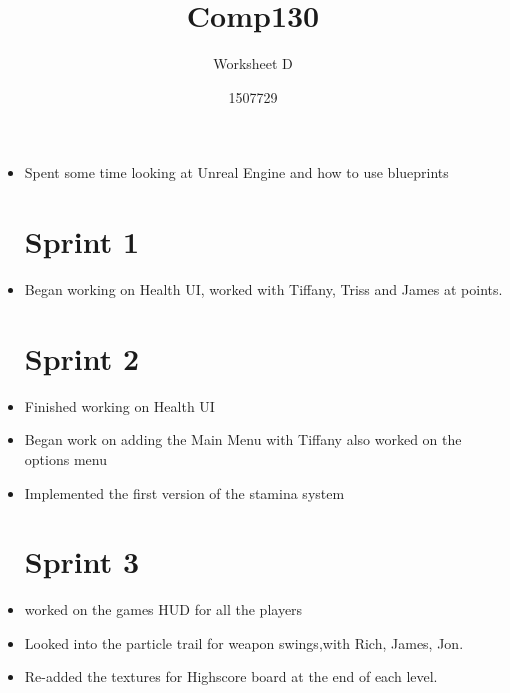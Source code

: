 \documentclass{scrartcl}
\title{Comp130}
\subtitle{Worksheet D}
\author{1507729}
\begin{document}
\maketitle

\begin{itemize}

\section{Sprint 0}

\item Spent some time looking at Unreal Engine and how to use blueprints


\section{Sprint 1}

\item Began working on Health UI, worked with Tiffany, Triss and James at points.


\section{Sprint 2}

\item Finished working on Health UI

\item Began work on adding the Main Menu with Tiffany also worked on the options menu

\item Implemented the first version of the stamina system


\section{Sprint 3}

\item worked on the games HUD for all the players

\item Looked into the particle trail for weapon swings,with Rich, James, Jon.

\item Re-added the textures for Highscore board at the end of each level.


\end{itemize}
\end{document}

